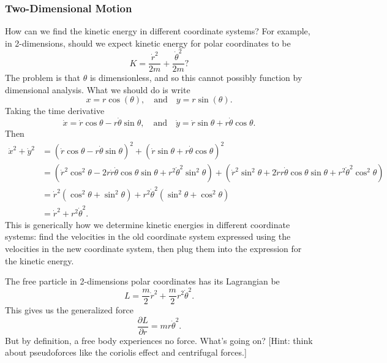 \subsubsection{Two-Dimensional Motion}

How can we find the kinetic energy in different coordinate systems? For
example, in 2-dimensions, should we expect kinetic energy for polar
coordinates to be
\begin{equation}
K = \frac{\dot{r}^{2}}{2m} + \frac{\dot{\theta}^{2}}{2m}?
\end{equation}
The problem is that $\theta$ is dimensionless, and so this cannot
possibly function by dimensional analysis. What we should do is write
\begin{equation}
x = r\cos(\theta),\quad\mbox{and}\quad y=r\sin(\theta).
\end{equation}
Taking the time derivative
\begin{equation}
  \dot{x} = \dot{r}\cos\theta -r\dot\theta\sin\theta,\quad\mbox{and}\quad
  \dot{y} = \dot{r}\sin\theta +r\dot\theta\cos\theta.
\end{equation}
Then
\begin{subequations}
\begin{align}
\dot{x}^{2}+\dot{y}^{2} &= \left(\dot{r}\cos\theta -r\dot\theta\sin\theta\right)^{2}
+ \left(\dot{r}\sin\theta +r\dot\theta\cos\theta\right)^2\\
&= \left(\dot{r}^{2}\cos^{2}\theta
-2r\dot{r}\dot\theta\cos\theta\sin\theta
+r^{2}\dot\theta^{2}\sin^{2}\theta\right)
+ \left(\dot{r}^2\sin^2\theta + 2\dot{r}r\dot\theta\cos\theta\sin\theta +r^2\dot\theta^2\cos^2\theta\right)\\
&=\dot{r}^{2}(\cos^{2}\theta + \sin^2\theta) + r^2\dot\theta^2(\sin^2\theta + \cos^2\theta)\\
&=\dot{r}^{2} + r^2\dot\theta^2.
\end{align}
\end{subequations}
This is generically how we determine kinetic energies in different
coordinate systems: find the velocities in the old coordinate system
expressed using the velocities in the new coordinate system, then plug
them into the expression for the kinetic energy.


The free particle in 2-dimensions polar coordinates has its Lagrangian
be
\begin{equation}
L = \frac{m}{2}\dot{r}^{2} + \frac{m}{2}r^2\dot\theta^2.
\end{equation}
This gives us the generalized force
\begin{equation}
\frac{\partial L}{\partial r} = mr\dot\theta^{2}.
\end{equation}
But by definition, a free body experiences no force. What's going on?
[Hint: think about pseudoforces like the coriolis effect and centrifugal forces.]

